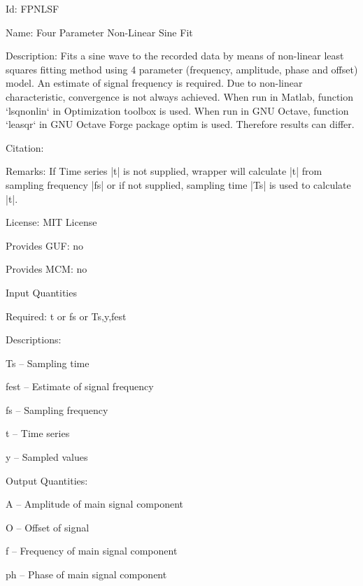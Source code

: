 \begin{tightdesc}
\item [Id:] FPNLSF
\item [Name:] Four Parameter Non-Linear Sine Fit
\item [Description:] Fits a sine wave to the recorded data by means of non-linear least squares fitting method using 4 parameter (frequency, amplitude, phase and offset) model. An estimate of signal frequency is required. Due to non-linear characteristic, convergence is not always achieved. When run in Matlab, function `lsqnonlin` in Optimization toolbox is used. When run in GNU Octave, function `leasqr` in GNU Octave Forge package optim is used. Therefore results can differ.
\item [Citation:] 
\item [Remarks:] If Time series |t| is not supplied, wrapper will calculate |t| from sampling frequency |fs| or if not supplied, sampling time |Ts| is used to calculate |t|.
\item [License:] MIT License
\item [Provides GUF:] no
\item [Provides MCM:] no
\item [Input Quantities] \rule{0em}{0em}
    \begin{tightdesc}
    \item [Required:] 
        \textsf{t} or \textsf{fs} or \textsf{Ts},\enspace \textsf{y},\enspace \textsf{fest}
    \item [Descriptions:] \rule{0em}{0em}
        \begin{tightdesc}
            \item[\textsf{Ts}] -- Sampling time
            \item[\textsf{fest}] -- Estimate of signal frequency
            \item[\textsf{fs}] -- Sampling frequency
            \item[\textsf{t}] -- Time series
            \item[\textsf{y}] -- Sampled values
        \end{tightdesc}
    \end{tightdesc}
\item [Output Quantities:] \rule{0em}{0em}
    \begin{tightdesc}
        \item[\textsf{A}] -- Amplitude of main signal component
        \item[\textsf{O}] -- Offset of signal
        \item[\textsf{f}] -- Frequency of main signal component
        \item[\textsf{ph}] -- Phase of main signal component
    \end{tightdesc}
\end{tightdesc}
